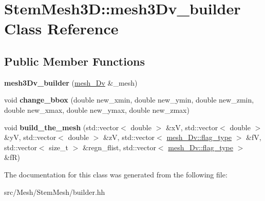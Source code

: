 \hypertarget{classStemMesh3D_1_1mesh3Dv__builder}{}\section{Stem\+Mesh3D\+:\+:mesh3\+Dv\+\_\+builder Class Reference}
\label{classStemMesh3D_1_1mesh3Dv__builder}
\subsection*{Public Member Functions}
\begin{DoxyCompactItemize}
\item 
\mbox{\label{classStemMesh3D_1_1mesh3Dv__builder_a9d137944a599ff6f41ef321838ae2f18}} 
{\bfseries mesh3\+Dv\+\_\+builder} (\hyperlink{classStemMesh3D_1_1mesh__3Dv}{mesh\+\_\+Dv} \&\+\_\+mesh)
\item 
\mbox{\label{classStemMesh3D_1_1mesh3Dv__builder_a05588bb9dff04c8a96e5785edf8932d2}} 
void {\bfseries change\+\_\+bbox} (double new\+\_\+xmin, double new\+\_\+ymin, double new\+\_\+zmin, double new\+\_\+xmax, double new\+\_\+ymax, double new\+\_\+zmax)
\item 
\mbox{\label{classStemMesh3D_1_1mesh3Dv__builder_a558c4675f98eec141945e26e709b1753}} 
void {\bfseries build\+\_\+the\+\_\+mesh} (std\+::vector$<$ double $>$ \&xV, std\+::vector$<$ double $>$ \&yV, std\+::vector$<$ double $>$ \&zV, std\+::vector$<$ \hyperlink{classStemMesh3D_1_1mesh__3Dv_a9544cba555b60f17f04fcd1689314338}{mesh\+\_\+Dv\+::flag\+\_\+type} $>$ \&fV, std\+::vector$<$ size\+\_\+t $>$ \&regn\+\_\+flist, std\+::vector$<$ \hyperlink{classStemMesh3D_1_1mesh__3Dv_a9544cba555b60f17f04fcd1689314338}{mesh\+\_\+Dv\+::flag\+\_\+type} $>$ \&fR)
\end{DoxyCompactItemize}


The documentation for this class was generated from the following file\+:\begin{DoxyCompactItemize}
\item 
src/\+Mesh/\+Stem\+Mesh/builder.\+hh\end{DoxyCompactItemize}

